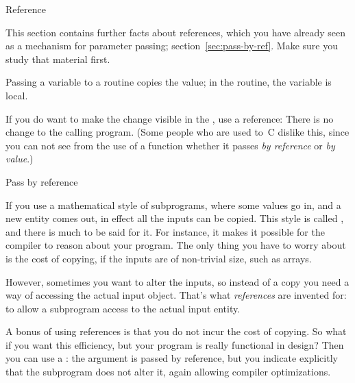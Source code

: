 
 {Reference}
\label{sec:reference}

This section contains further facts about references, which you have
already seen as a mechanism for parameter passing;
section~\ref{sec:pass-by-ref}.
Make sure you study that material first.

Passing a variable to a routine copies the value;
in the routine, the variable is local.


If you do want to make the change visible in the
%
, use a reference:
%
%
There is no change to the calling program.
(Some people who are used to~C dislike this,
since you can not see from the use of a function whether it passes
%
\emph{by reference}
%
or \emph{by value}.)

 {Pass by reference}

If you use a mathematical style of subprograms, where some values go
in, and a new entity comes out, in effect all the inputs can be
copied. This style is called
, and
there is much to be said for it. For instance, it makes it possible
for the compiler to reason about your program.
The only thing you have to worry
about is the cost of copying, if the inputs are of non-trivial size,
such as arrays.

However, sometimes you want to alter the inputs, so instead of a copy
you need a way of accessing the actual input object. That's what
\emph{references} are invented for: to allow a subprogram access to the
actual input entity.

A bonus of using references is that you do not incur the cost of
copying. So what if you want this efficiency, but your program is
really functional in design? Then you can use a
: the argument is passed by reference,
but you indicate explicitly that the subprogram does not alter it,
again allowing compiler optimizations.

